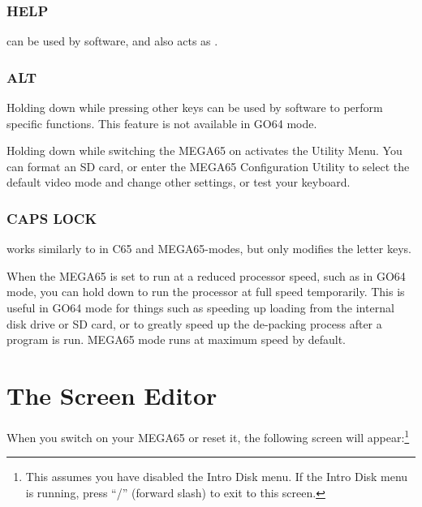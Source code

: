 \subsubsection{HELP}
 can be used by software, and also acts as .

\subsubsection{ALT}
Holding  down while pressing other keys can be used by software to perform specific functions. This feature is not available in GO64 mode.

Holding  down while switching the MEGA65 on activates the Utility Menu. You can format an SD card, or enter the MEGA65 Configuration Utility to select the default video mode and change other settings, or test your keyboard.

\subsubsection{CAPS LOCK}
 works similarly to  in C65 and MEGA65-modes, but only modifies the letter keys.

When the MEGA65 is set to run at a reduced processor speed, such as in GO64 mode, you can hold down  to run the processor at full speed temporarily. This is useful in GO64 mode for things such as
speeding up loading from the internal disk drive or SD card, or to greatly speed up the de-packing process after a program is run. MEGA65 mode runs at maximum speed by default.



\section{The Screen Editor}
\label{sec:screen-editor}

When you switch on your MEGA65 or reset it, the following screen will appear:\footnote{This assumes you have disabled the Intro Disk menu. If the Intro Disk menu is running, press ``/'' (forward slash) to exit to this screen.}

